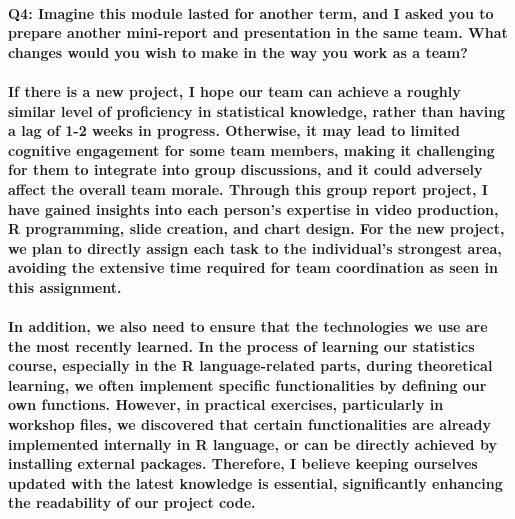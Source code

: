 \documentclass[11pt]{article} %
\begin{document}
\paragraph{\textbf{Q4: Imagine this module lasted for another term, and I asked you to prepare another mini-report and presentation in the same team. What changes would you wish to make in the way you work as a team?}}
% 
% 
% 
\paragraph{If there is a new project, I hope our team can achieve a roughly similar level of proficiency in statistical knowledge, rather than having a lag of 1-2 weeks in progress. Otherwise, it may lead to limited cognitive engagement for some team members, making it challenging for them to integrate into group discussions, and it could adversely affect the overall team morale. Through this group report project, I have gained insights into each person's expertise in video production, R programming, slide creation, and chart design. For the new project, we plan to directly assign each task to the individual's strongest area, avoiding the extensive time required for team coordination as seen in this assignment.}
% 
\paragraph{In addition, we also need to ensure that the technologies we use are the most recently learned. In the process of learning our statistics course, especially in the R language-related parts, during theoretical learning, we often implement specific functionalities by defining our own functions. However, in practical exercises, particularly in workshop files, we discovered that certain functionalities are already implemented internally in R language, or can be directly achieved by installing external packages. Therefore, I believe keeping ourselves updated with the latest knowledge is essential, significantly enhancing the readability of our project code.}
% 
% 
% 
% 
% 
\end{document}
